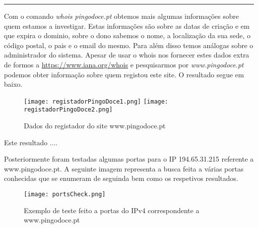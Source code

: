 \noindent\rule{8cm}{0.4pt}

\par Com o comando \textit{whois pingodoce.pt} obtemos mais algumas informações sobre quem estamos a investigar.\newline
Estas informações são sobre as datas de criação e em que expira o dominio, sobre o dono sabemos o nome, a localização da sua sede, o código postal, o pais e o email do mesmo. Para além disso temos análogas sobre o administrador do sistema.\newline
Apesar de usar o whois nos fornecer estes dados extra de formos a \url{https://www.iana.org/whois} e pesquisarmos por \textit{www.pingodoce.pt} podemos obter informação sobre quem registou este site. O resultado segue em baixo.

\begin{figure}[H]

	\centering

 	\texttt{[image: registadorPingoDoce1.png]}
 	\texttt{[image: registadorPingoDoce2.png]}
 	\caption {Dados do registador do site www.pingodoce.pt}

  	\label{fig01}
\end{figure}




Este resultado ....



Posteriormente foram testadas algumas portas para o IP 194.65.31.215 referente a www.pingodoce.pt. A seguinte imagem representa a busca feita a várias portas conhecidas que se enumeram de seguinda bem como os respetivos resultados.

\begin{figure}[H]

	\centering

 	\texttt{[image: portsCheck.png]}
 	\caption {Exemplo de teste feito a portas do IPv4 correspondente a www.pingodoce.pt}

  	\label{fig02}
\end{figure}

